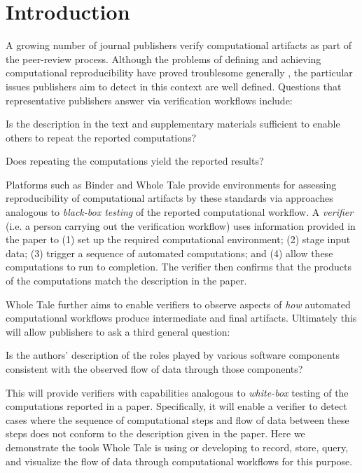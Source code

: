 \vspace*{-2em}

\section{Introduction}

A growing number of journal publishers verify computational artifacts as part of the peer-review process. Although the problems of defining and achieving computational reproducibility have proved troublesome generally \cite{reproducibilitynas}, the particular issues publishers aim to detect in this context are well defined. Questions that representative publishers answer via verification workflows include:

\begin{itemize}

\tinyitem Is the description in the text and supplementary materials sufficient to enable others to repeat the reported computations?

\tinyitem Does repeating the computations yield the reported results?

\end{itemize}

Platforms such as Binder \cite{Binder_2018} and Whole Tale  \cite{brinckman2019computing} provide environments for assessing reproducibility of computational artifacts by these standards via approaches analogous to \emph{black-box testing} of the reported computational workflow. A \emph{verifier} (i.e. a person carrying out the verification workflow) uses information provided in the paper to (1) set up the required computational environment; (2) stage input data; (3) trigger a sequence of automated computations; and (4) allow these computations to run to completion. The verifier then confirms that the products of the computations match the description in the paper.

Whole Tale further aims to enable verifiers to observe aspects of \emph{how} automated computational workflows produce intermediate and final artifacts. Ultimately this will allow publishers to ask a third general question:

\begin{itemize}

\tinyitem Is the authors' description of the roles played by various software components consistent with the observed flow of data through those components?

\end{itemize}

This will provide verifiers with capabilities analogous to \emph{white-box} testing of the computations reported in a paper. Specifically, it will enable a verifier to detect cases where the sequence of computational steps and flow of data between these steps does not conform to the description given in the paper. Here we demonstrate the tools Whole Tale is using or developing to record, store, query, and visualize the flow of data through computational workflows for this purpose.








